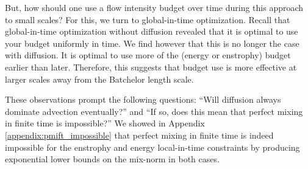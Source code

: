 But, how should one use a flow intensity budget over time during this approach to small scales? For this, we turn to global-in-time optimization.  Recall that global-in-time optimization without diffusion revealed that it is optimal to use your budget uniformly in time. We find however that this is no longer the case with diffusion. It is optimal to use more of the (energy or enstrophy) budget earlier than later. Therefore, this suggests that budget use is more effective at larger scales away from the Batchelor length scale.

These observations prompt the following questions: ``Will diffusion always dominate advection eventually?'' and ``If so, does this mean that perfect mixing in finite time is impossible?'' We showed in Appendix  \ref{appendix:pmift_impossible} that perfect mixing in finite time is indeed impossible for the enstrophy and energy local-in-time constraints by producing exponential lower bounds on the mix-norm in both cases. 


